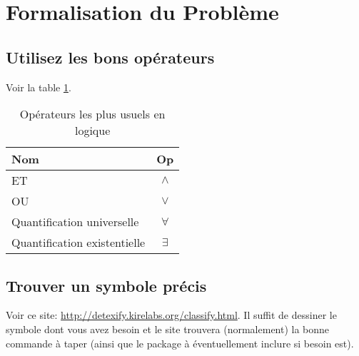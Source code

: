 \section{Formalisation du Problème}\label{formalisation}

\subsection{Utilisez les bons opérateurs}

Voir la table \ref{table:op}.

\begin{table}[!h]
\centering
\begin{tabular}{l c}
Nom & Op \\
\hline
ET & $\land$ \\
OU & $\lor$ \\
Quantification universelle & $\forall$ \\
Quantification existentielle & $\exists$ \\
\end{tabular}
\caption{Opérateurs les plus usuels en logique}
\label{table:op}
\end{table}

\subsection{Trouver un symbole précis}

Voir ce site: \url{http://detexify.kirelabs.org/classify.html}. Il suffit de dessiner le symbole dont vous avez besoin et le site trouvera (normalement) la bonne commande à taper (ainsi que le package à éventuellement inclure si besoin est).
